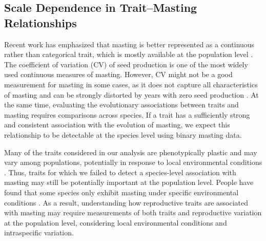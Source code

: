 \documentclass{article}
\begin{document}
\subsection{Scale Dependence in Trait–Masting Relationships}
Recent work has emphasized that masting is better represented as a continuous rather than categorical trait, which is mostly available at the population level \citep{bogdziewicz2024evolutionary, bogdziewicz2025dynamics}. The coefficient of variation (CV) of seed production is one of the most widely used continuous measures of masting. However, CV might not be a good measurement for masting in some cases, as it does not capture all characteristics of masting and can be strongly distorted by years with zero seed production \citep{bogdziewicz2023measure}. At the same time, evaluating the evolutionary associations between traits and masting requires comparisons across species. If a trait has a sufficiently strong and consistent association with the evolution of masting, we expect this relationship to be detectable at the species level using binary masting data.

Many of the traits considered in our analysis are phenotypically plastic and may vary among populations, potentially in response to local environmental conditions \citep{matesanz2010global}. Thus, traits for which we failed to detect a species-level association with masting may still be potentially important at the population level. People have found that some species only exhibit masting under specific environmental conditions \citep{fleurot2023oak, bogdziewicz2025dynamics}. As a result, understanding how reproductive traits are associated with masting may require measurements of both traits and reproductive variation at the population level, considering local environmental conditions and intraspecific variation.
\end{document}
